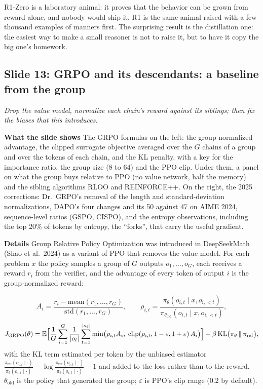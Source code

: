 \documentclass[11pt,letterpaper]{article}
\newcommand{\slide}[3]{%
  \subsection[Slide #1: #2]{Slide #1: #2}%
  {\color{muted}\itshape #3\par}\medskip}
\newcommand{\para}[1]{\medskip\noindent\textbf{#1}\quad}
\newenvironment{intuition}{\begin{tcolorbox}[intuitionbox]}{\end{tcolorbox}}
\newenvironment{formulas}{\begin{tcolorbox}[formulabox]}{\end{tcolorbox}}
\newcommand{\E}{\mathbb{E}}
\DeclareMathOperator{\clip}{clip}
\begin{document}
\begin{intuition}
R1-Zero is a laboratory animal: it proves that the behavior can be grown from reward alone, and nobody would ship it. R1 is the same animal raised with a few thousand examples of manners first. The surprising result is the distillation one: the easiest way to make a small reasoner is not to raise it, but to have it copy the big one's homework.
\end{intuition}

\slide{13}{GRPO and its descendants: a baseline from the group}{Drop the value model, normalize each chain's reward against its siblings; then fix the biases that this introduces.}

\para{What the slide shows} The GRPO formulas on the left: the group-normalized advantage, the clipped surrogate objective averaged over the $G$ chains of a group and over the tokens of each chain, and the KL penalty, with a key for the importance ratio, the group size (8 to 64) and the PPO clip. Under them, a panel on what the group buys relative to PPO (no value network, half the memory) and the sibling algorithms RLOO and REINFORCE++. On the right, the 2025 corrections: Dr.\ GRPO's removal of the length and standard-deviation normalizations, DAPO's four changes and its 50 against 47 on AIME 2024, sequence-level ratios (GSPO, CISPO), and the entropy observations, including the top 20\% of tokens by entropy, the ``forks'', that carry the useful gradient.

\para{Details} Group Relative Policy Optimization was introduced in DeepSeekMath (Shao et al.\ 2024) as a variant of PPO that removes the value model. For each problem $x$ the policy samples a group of $G$ outputs $o_1,\ldots,o_G$, each receives a reward $r_i$ from the verifier, and the advantage of every token of output $i$ is the group-normalized reward:

\begin{formulas}
\[
A_i=\frac{r_i-\mathrm{mean}(r_1,\ldots,r_G)}{\mathrm{std}(r_1,\ldots,r_G)},
\qquad
\rho_{i,t}=\frac{\pi_\theta(o_{i,t}\mid x,o_{i,<t})}{\pi_{\theta_{\mathrm{old}}}(o_{i,t}\mid x,o_{i,<t})},
\]
\[
J_{\mathrm{GRPO}}(\theta)=\E\Bigl[\frac1G\sum_{i=1}^{G}\frac{1}{|o_i|}\sum_{t=1}^{|o_i|}
\min\bigl(\rho_{i,t}A_i,\;\clip(\rho_{i,t},1-\varepsilon,1+\varepsilon)\,A_i\bigr)\Bigr]
-\beta\,\mathrm{KL}\bigl(\pi_\theta\,\|\,\pi_{\mathrm{ref}}\bigr),
\]
with the KL term estimated per token by the unbiased estimator $\frac{\pi_{\mathrm{ref}}(o_{i,t}\mid\cdot)}{\pi_\theta(o_{i,t}\mid\cdot)}-\log\frac{\pi_{\mathrm{ref}}(o_{i,t}\mid\cdot)}{\pi_\theta(o_{i,t}\mid\cdot)}-1$ and added to the loss rather than to the reward. $\theta_{\mathrm{old}}$ is the policy that generated the group; $\varepsilon$ is PPO's clip range (0.2 by default).
\end{formulas}
\end{document}
